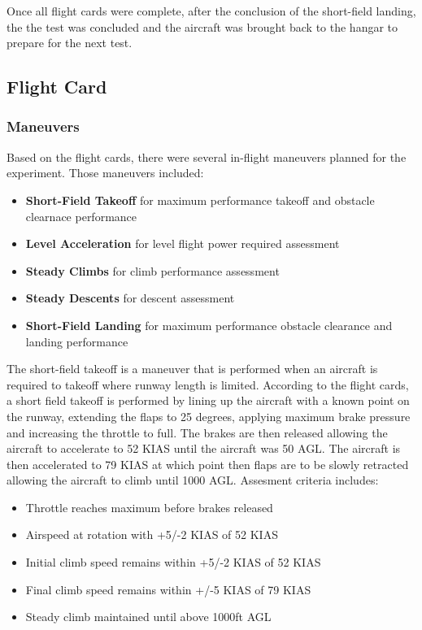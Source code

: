 \documentclass[conf]{new-aiaa}
\begin{document}
\medskip Once all flight cards were complete, after the conclusion of the short-field landing, the the test was concluded and the aircraft was brought back to the hangar to prepare for the next test.

\subsection{Flight Card}
\subsubsection{Maneuvers}
Based on the flight cards, there were several in-flight maneuvers planned for the experiment. Those maneuvers included:
\medskip
\begin{itemize}
\item \textbf{Short-Field Takeoff} for maximum performance takeoff and obstacle clearnace performance
\item \textbf{Level Acceleration} for level flight power required assessment
\item \textbf{Steady Climbs} for climb performance assessment
\item \textbf{Steady Descents} for descent assessment
\item \textbf{Short-Field Landing} for maximum performance obstacle clearance and landing performance
\end{itemize}

\medskip


The short-field takeoff is a maneuver that is performed when an aircraft is required to takeoff where runway length is limited. According to the flight cards, a short field takeoff is performed by lining up the aircraft with a known point on the runway, extending the flaps to 25 degrees, applying maximum brake pressure and increasing the throttle to full. The brakes are then released allowing the aircraft to accelerate to 52 KIAS until the aircraft was 50 AGL. The aircraft is then accelerated to 79 KIAS at which point then flaps are to be slowly retracted allowing the aircraft to climb until 1000 AGL. Assesment criteria includes:

\medskip

\begin{itemize}
\item Throttle reaches maximum before brakes released
\item Airspeed at rotation with +5/-2 KIAS of 52 KIAS
\item Initial climb speed remains within +5/-2 KIAS of 52 KIAS
\item Final climb speed remains within +/-5 KIAS of 79 KIAS
\item Steady climb maintained until above 1000ft AGL
\end{itemize}
\end{document}
